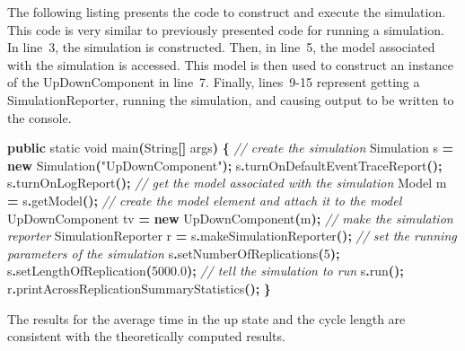 \documentclass[
]{book}
\newenvironment{Shaded}{\begin{snugshade}}{\end{snugshade}}
\newcommand{\BuiltInTok}[1]{#1}
\newcommand{\CommentTok}[1]{\textcolor[rgb]{0.56,0.35,0.01}{\textit{#1}}}
\newcommand{\DataTypeTok}[1]{\textcolor[rgb]{0.13,0.29,0.53}{#1}}
\newcommand{\DecValTok}[1]{\textcolor[rgb]{0.00,0.00,0.81}{#1}}
\newcommand{\FloatTok}[1]{\textcolor[rgb]{0.00,0.00,0.81}{#1}}
\newcommand{\FunctionTok}[1]{\textcolor[rgb]{0.00,0.00,0.00}{#1}}
\newcommand{\KeywordTok}[1]{\textcolor[rgb]{0.13,0.29,0.53}{\textbf{#1}}}
\newcommand{\NormalTok}[1]{#1}
\newcommand{\OperatorTok}[1]{\textcolor[rgb]{0.81,0.36,0.00}{\textbf{#1}}}
\newcommand{\StringTok}[1]{\textcolor[rgb]{0.31,0.60,0.02}{#1}}
\theoremstyle{definition}
\theoremstyle{definition}
\theoremstyle{definition}
\theoremstyle{definition}
\theoremstyle{remark}
\begin{document}
The following listing presents the code to construct and execute the
simulation. This code is very similar to previously presented code for
running a simulation. In line~3, the simulation is constructed. Then, in
line~5, the model associated with the simulation is accessed. This model
is then used to construct an instance of the UpDownComponent in line~7.
Finally, lines~9-15 represent getting a SimulationReporter, running the
simulation, and causing output to be written to the console.

\begin{Shaded}
\begin{Highlighting}[]
\KeywordTok{public} \DataTypeTok{static} \DataTypeTok{void} \FunctionTok{main}\OperatorTok{(}\BuiltInTok{String}\OperatorTok{[]}\NormalTok{ args}\OperatorTok{)} \OperatorTok{\{}
    \CommentTok{// create the simulation}
\NormalTok{    Simulation s }\OperatorTok{=} \KeywordTok{new} \FunctionTok{Simulation}\OperatorTok{(}\StringTok{"UpDownComponent"}\OperatorTok{);}
\NormalTok{    s}\OperatorTok{.}\FunctionTok{turnOnDefaultEventTraceReport}\OperatorTok{();}
\NormalTok{    s}\OperatorTok{.}\FunctionTok{turnOnLogReport}\OperatorTok{();}
    \CommentTok{// get the model associated with the simulation}
\NormalTok{    Model m }\OperatorTok{=}\NormalTok{ s}\OperatorTok{.}\FunctionTok{getModel}\OperatorTok{();}
    \CommentTok{// create the model element and attach it to the model}
\NormalTok{    UpDownComponent tv }\OperatorTok{=} \KeywordTok{new} \FunctionTok{UpDownComponent}\OperatorTok{(}\NormalTok{m}\OperatorTok{);}
    \CommentTok{// make the simulation reporter}
\NormalTok{    SimulationReporter r }\OperatorTok{=}\NormalTok{ s}\OperatorTok{.}\FunctionTok{makeSimulationReporter}\OperatorTok{();}
    \CommentTok{// set the running parameters of the simulation}
\NormalTok{    s}\OperatorTok{.}\FunctionTok{setNumberOfReplications}\OperatorTok{(}\DecValTok{5}\OperatorTok{);}
\NormalTok{    s}\OperatorTok{.}\FunctionTok{setLengthOfReplication}\OperatorTok{(}\FloatTok{5000.0}\OperatorTok{);}
    \CommentTok{// tell the simulation to run}
\NormalTok{    s}\OperatorTok{.}\FunctionTok{run}\OperatorTok{();}
\NormalTok{    r}\OperatorTok{.}\FunctionTok{printAcrossReplicationSummaryStatistics}\OperatorTok{();}
\OperatorTok{\}}
\end{Highlighting}
\end{Shaded}

The results for the average time in the up state and the cycle length are consistent
with the theoretically computed results.
\end{document}
